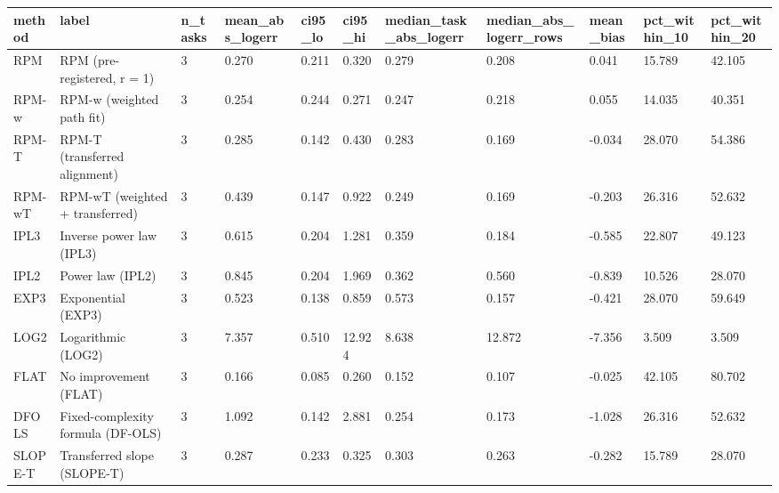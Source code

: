 \begin{tabular}{lllllllllll}
\hline
method & label & n\_tasks & mean\_abs\_logerr & ci95\_lo & ci95\_hi & median\_task\_abs\_logerr & median\_abs\_logerr\_rows & mean\_bias & pct\_within\_10 & pct\_within\_20 \\
\hline
RPM & RPM (pre-registered, r = 1) & 3 & 0.270 & 0.211 & 0.320 & 0.279 & 0.208 & 0.041 & 15.789 & 42.105 \\
RPM-w & RPM-w (weighted path fit) & 3 & 0.254 & 0.244 & 0.271 & 0.247 & 0.218 & 0.055 & 14.035 & 40.351 \\
RPM-T & RPM-T (transferred alignment) & 3 & 0.285 & 0.142 & 0.430 & 0.283 & 0.169 & -0.034 & 28.070 & 54.386 \\
RPM-wT & RPM-wT (weighted + transferred) & 3 & 0.439 & 0.147 & 0.922 & 0.249 & 0.169 & -0.203 & 26.316 & 52.632 \\
IPL3 & Inverse power law (IPL3) & 3 & 0.615 & 0.204 & 1.281 & 0.359 & 0.184 & -0.585 & 22.807 & 49.123 \\
IPL2 & Power law (IPL2) & 3 & 0.845 & 0.204 & 1.969 & 0.362 & 0.560 & -0.839 & 10.526 & 28.070 \\
EXP3 & Exponential (EXP3) & 3 & 0.523 & 0.138 & 0.859 & 0.573 & 0.157 & -0.421 & 28.070 & 59.649 \\
LOG2 & Logarithmic (LOG2) & 3 & 7.357 & 0.510 & 12.924 & 8.638 & 12.872 & -7.356 & 3.509 & 3.509 \\
FLAT & No improvement (FLAT) & 3 & 0.166 & 0.085 & 0.260 & 0.152 & 0.107 & -0.025 & 42.105 & 80.702 \\
DFOLS & Fixed-complexity formula (DF-OLS) & 3 & 1.092 & 0.142 & 2.881 & 0.254 & 0.173 & -1.028 & 26.316 & 52.632 \\
SLOPE-T & Transferred slope (SLOPE-T) & 3 & 0.287 & 0.233 & 0.325 & 0.303 & 0.263 & -0.282 & 15.789 & 28.070 \\
\hline
\end{tabular}
